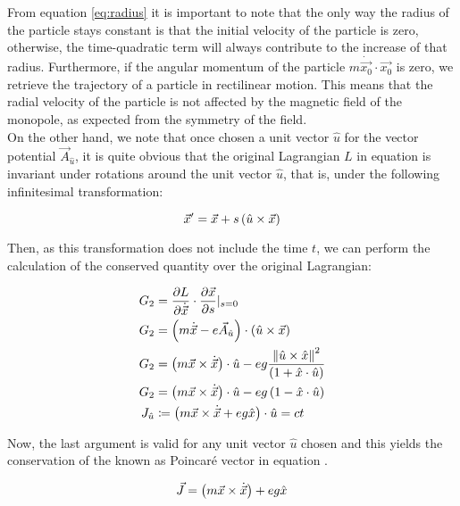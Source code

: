 From equation \ref{eq:radius} it is important to note that the only way the radius of the particle stays constant is that the initial velocity of the particle is zero, otherwise, the time-quadratic term will always contribute to the increase of that radius. Furthermore, if the angular momentum of the particle $m\dot{\vec{x_0}}\cdot\vec{x_0}$ is zero, we retrieve the trajectory of a particle in rectilinear motion. This means that the radial velocity of the particle is not affected by the magnetic field of the monopole, as expected from the symmetry of the field.\\

On the other hand, we note that once chosen a unit vector $\hat{u}$ for the vector potential  $\vec{A}_{\hat{u}}$, it is quite obvious that the original Lagrangian $L$ in equation  is invariant under rotations around the unit vector $\hat{u}$, that is, under the following infinitesimal transformation:

\begin{equation}
\vec{x}' = \vec{x} + s\left( \hat{u}\times\vec{x} \right)
\label{eq:rotinv}
\end{equation}

Then, as this transformation does not include the time $t$, we can perform the calculation of the conserved quantity over the original Lagrangian:

\begin{align*}
G_2 &= \frac{\partial L}{\partial \dot{\vec{x}}}\cdot\frac{\partial \vec{x}}{\partial s} \rvert_{s=0}\\
G_2 &= \left( m\dot{\vec{x}} - e\vec{A}_{\hat{u}} \right)\cdot \left( \hat{u}\times\vec{x} \right) \\
G_2 &= \left( m\vec{x}\times\dot{\vec{x}} \right)\cdot\hat{u}-eg\frac{\left\lVert \hat{u}\times\hat{x} \right\rVert^2}{\left( 1+\hat{x}\cdot\hat{u} \right)}\\
G_2 &= \left( m\vec{x}\times\dot{\vec{x}} \right)\cdot\hat{u} -eg\left( 1-\hat{x}\cdot\hat{u} \right)\\
J_{\hat{u}} &\coloneqq \left( {m\vec{x}\times\dot{\vec{x}}}+ eg\hat{x} \right)\cdot\hat{u} = ct
\end{align*}

Now, the last argument is valid for any unit vector $\hat{u}$ chosen and this yields the conservation of the  known as Poincar\'e vector in equation .

\begin{equation}
\vec{J} = \left( m\vec{x}\times\dot{\vec{x}} \right)+ eg\hat{x}
\label{eq:poincarevec}
\end{equation}

